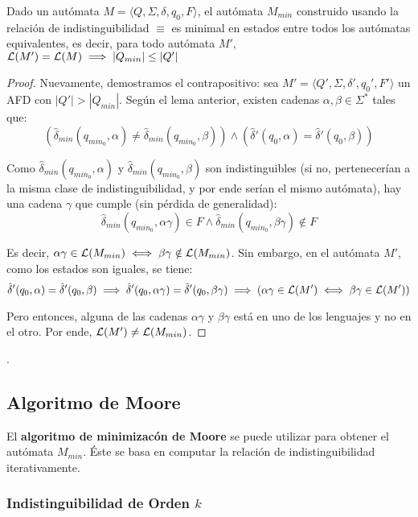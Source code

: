 \begin{theorem*}
    Dado un autómata $M = \langle Q, \Sigma, \delta, q_0, F \rangle$, el autómata $M_{min}$ construido usando la relación de indistinguibilidad $\equiv$ es minimal en estados entre todos los autómatas equivalentes, es decir, para todo autómata $M'$, $\mathcal{L}(M') = \mathcal{L}(M) \implies |Q_{min}| \leq |Q'|$
\end{theorem*}
\begin{proof}
    Nuevamente, demostramos el contrapositivo: sea $M'= \langle Q', \Sigma, \delta', q_0', F' \rangle$ un AFD con $|Q'| > |Q_{min}|$. Según el lema anterior, existen cadenas $\alpha, \beta \in \Sigma^*$ tales que:
    $$
        (\hat\delta_{min}(q_{min_0}, \alpha) \neq \hat\delta_{min}(q_{min_0}, \beta)) \land (\hat\delta'(q_0, \alpha) = \hat\delta'(q_0, \beta))
    $$

    Como $\hat\delta_{min}(q_{min_0}, \alpha)$ y $\hat\delta_{min}(q_{min_0}, \beta)$ son indistinguibles (si no, pertenecerían a la misma clase de indistinguibilidad, y por ende serían el mismo autómata), hay una cadena $\gamma$ que cumple (sin pérdida de generalidad):
    $$
        \hat\delta_{min}(q_{min_0}, \alpha\gamma) \in F \land \hat\delta_{min}(q_{min_0}, \beta\gamma) \notin F
    $$

    Es decir, $\alpha\gamma \in \mathcal{L}(M_{min}) \iff \beta\gamma \notin \mathcal{L}(M_{min})$. Sin embargo, en el autómata $M'$, como los estados son iguales, se tiene:
    $$
        \hat\delta'(q_0, \alpha) = \hat\delta'(q_0, \beta) \implies \hat\delta'(q_0, \alpha\gamma) = \hat\delta'(q_0, \beta\gamma) \implies (\alpha\gamma \in \mathcal{L}(M') \iff \beta\gamma \in \mathcal{L}(M'))
    $$

    Pero entonces, alguna de las cadenas $\alpha\gamma$ y $\beta\gamma$ está en uno de los lenguajes y no en el otro. Por ende, $\mathcal{L}(M') \neq \mathcal{L}(M_{min})$.
\end{proof}.

\subsection{Algoritmo de Moore}

El \textbf{algoritmo de minimizacón de Moore} se puede utilizar para obtener el autómata $M_{min}$. Éste se basa en computar la relación de indistinguibilidad iterativamente.

\subsubsection{Indistinguibilidad de Orden $k$}

